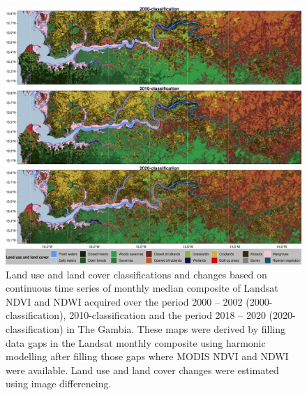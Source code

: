 \documentclass[utf8]{frontiersSCNS}
\begin{document}
\begin{figure}
\includegraphics[width=1\linewidth]{figures/Gambia_classifications} \caption{Land use and land cover classifications and changes based on continuous time series of monthly median composite of Landsat NDVI and NDWI acquired over the period 2000 – 2002 (2000-classification), 2010-classification and the period 2018 – 2020 (2020-classification) in The Gambia. These maps were derived by filling data gaps in the Landsat monthly composite using harmonic modelling after filling those gaps where MODIS NDVI and NDWI were available. Land use and land cover changes were estimated using image differencing.}\label{fig:fig7}
\end{figure}
\end{document}
